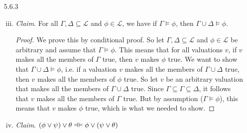 	\begin{enumerate}
	
		\item[5.6.3] 
		
		\begin{enumerate}[(i)]
		
			\setcounter{enumii}{2}
			
			\item \emph{Claim}. For all $\Gamma,\Delta\subseteq\mathcal{L}$ and $\phi\in\mathcal{L}$, we have if $\Gamma\vDash\phi$, then $\Gamma\cup\Delta\vDash\phi$.
			
			\begin{proof}
			We prove this by conditional proof. So let $\Gamma,\Delta\subseteq\mathcal{L}$ and $\phi\in\mathcal{L}$ be arbitrary and assume that $\Gamma\vDash\phi$. This means that for all valuations $v$, if $v$ makes all the members of $\Gamma$ true, then $v$ makes $\phi$ true. We want to show that $\Gamma\cup\Delta\vDash\phi$, i.e. if a valuation $v$ makes all the members of  $\Gamma\cup\Delta$ true, then $v$ makes all the members of $\phi$ true. So let $v$ be an arbitrary valuation that makes all the members of  $\Gamma\cup\Delta$ true. Since $\Gamma\subseteq\Gamma\subseteq\Delta$, it follows that $v$ makes all the members of $\Gamma$ true. But by assumption ($\Gamma\vDash\phi$), this means that $v$ makes $\phi$ true, which is what we needed to show.
			\end{proof}
		
			\setcounter{enumii}{12}
			
			\item \emph{Claim}. $(\phi\lor\psi)\lor\theta\equi \phi\lor(\psi\lor\theta)$
			

\end{enumerate}
\end{enumerate}
